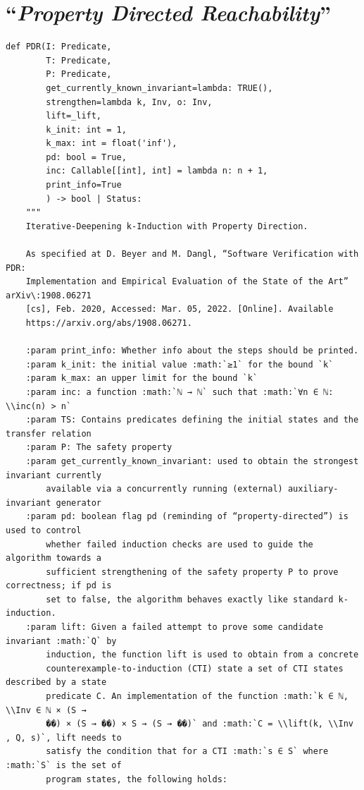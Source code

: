 \documentclass[11pt,a4paper]{report}%
\newenvironment{code}{\captionsetup{type=listing}}{}
\def\pdr{``\textit{Property Directed Reachability}''\xspace}
\begin{document}
\section{\pdr}

\begin{code}
\begin{verbatim}
def PDR(I: Predicate,
        T: Predicate,
        P: Predicate,
        get_currently_known_invariant=lambda: TRUE(),
        strengthen=lambda k, Inv, o: Inv,
        lift=_lift,
        k_init: int = 1,
        k_max: int = float('inf'),
        pd: bool = True,
        inc: Callable[[int], int] = lambda n: n + 1,
        print_info=True
        ) -> bool | Status:
    """
    Iterative-Deepening k-Induction with Property Direction.

    As specified at D. Beyer and M. Dangl, “Software Verification with PDR:
    Implementation and Empirical Evaluation of the State of the Art” arXiv\:1908.06271
    [cs], Feb. 2020, Accessed: Mar. 05, 2022. [Online]. Available
    https://arxiv.org/abs/1908.06271.

    :param print_info: Whether info about the steps should be printed.
    :param k_init: the initial value :math:`≥1` for the bound `k`
    :param k_max: an upper limit for the bound `k`
    :param inc: a function :math:`ℕ → ℕ` such that :math:`∀n ∈ ℕ: \\inc(n) > n`
    :param TS: Contains predicates defining the initial states and the transfer relation
    :param P: The safety property
    :param get_currently_known_invariant: used to obtain the strongest invariant currently
        available via a concurrently running (external) auxiliary-invariant generator
    :param pd: boolean flag pd (reminding of “property-directed”) is used to control
        whether failed induction checks are used to guide the algorithm towards a
        sufficient strengthening of the safety property P to prove correctness; if pd is
        set to false, the algorithm behaves exactly like standard k-induction.
    :param lift: Given a failed attempt to prove some candidate invariant :math:`Q` by
        induction, the function lift is used to obtain from a concrete
        counterexample-to-induction (CTI) state a set of CTI states described by a state
        predicate C. An implementation of the function :math:`k ∈ ℕ, \\Inv ∈ ℕ × (S →
        ��) × (S → ��) × S → (S → ��)` and :math:`C = \\lift(k, \\Inv , Q, s)`, lift needs to
        satisfy the condition that for a CTI :math:`s ∈ S` where :math:`S` is the set of
        program states, the following holds:


\end{verbatim}
\end{code}
\end{document}

